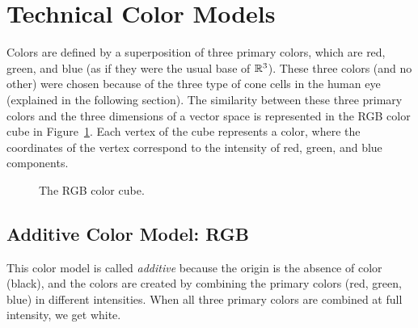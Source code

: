 \section{Technical Color Models}

Colors are defined by a superposition of three primary colors, which are red, green, and blue (as if they were the usual base of $\mathbb{R}^3$). These three colors (and no other) were chosen because of the three type of cone cells in the human eye (explained in the following section). The similarity between these three primary colors and the three dimensions of a vector space is represented in the RGB color cube in Figure~\ref{fig:color_cube}. Each vertex of the cube represents a color, where the coordinates of the vertex correspond to the intensity of red, green, and blue components.
\begin{figure}
    \centering
    \caption{The RGB color cube.}
    \label{fig:color_cube}
\end{figure}

\subsection{Additive Color Model: RGB}

This color model is called \emph{additive} because the origin is the absence of color (black), and the colors are created by combining the primary colors (red, green, blue) in different intensities. When all three primary colors are combined at full intensity, we get white.

